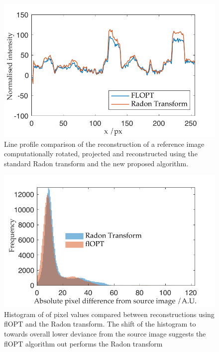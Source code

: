 \begin{figure}
  \centering
  \includegraphics{Chapters/flopt/Figs/PDF/results/comparison_line_profile}
  \caption{Line profile comparison of the reconstruction of a reference image computationally rotated, projected and reconstructed using the standard \gls{Radon transform} and the new proposed algorithm.}
  \label{fig:flopt_comparison_line_profile}
\end{figure}

\begin{figure}
  \centering
  \includegraphics{Chapters/flopt/Figs/PDF/results/flopt_histogram}
  \caption{Histogram of of pixel values compared between reconstructions using flOPT and the \gls{Radon transform}.
  The shift of the histogram to towards overall lower deviance from the source image suggests the flOPT algorithm out performs the \gls{Radon transform}}
  \label{fig:flopt_histogram}
\end{figure}



